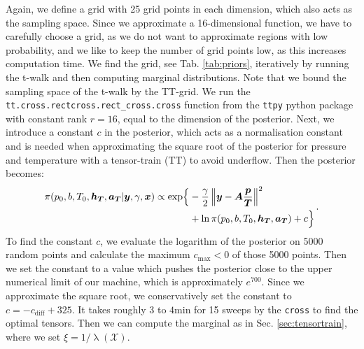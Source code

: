 Again, we define a grid with 25 grid points in each dimension, which also acts as the sampling space.
Since we approximate a 16-dimensional function, we have to carefully choose a grid, as we do not want to approximate regions with low probability, and we like to keep the number of grid points low, as this increases computation time.
We find the grid, see Tab. \ref{tab:priors}, iteratively by running the t-walk and then computing marginal distributions.
Note that we bound the sampling space of the t-walk by the TT-grid.
We run the  \texttt{tt.cross.rectcross.rect\_cross.cross} function from the \texttt{ttpy} python package \cite{} with constant rank $r = 16$, equal to the dimension of the posterior.
Next, we introduce a constant $c$ in the posterior, which acts as a normalisation constant and is needed when approximating the square root of the posterior for pressure and temperature with a tensor-train (TT) to avoid underflow.
Then the posterior becomes:
\begin{align}
	\begin{split}
		\pi(p_0,b,T_0,\bm{h_T},\bm{a_T} | \bm{y}, \gamma, \bm{x}) \propto  \exp\Bigl\{ & -\frac{\gamma}{2} \left\Vert \bm{y}- \bm{A} \frac{\bm{p}}{\bm{T}}  \right\Vert^2 \\ &+ \ln{\pi(p_0,b,T_0,\bm{h_T},\bm{a_T}) + c \Bigr\}  }
	\end{split} \, .
	\label{eq:TTpostPT}
\end{align}
To find the constant $c$, we evaluate the logarithm of the posterior on 5000 random points and calculate the maximum $c_{\text{max}} < 0$ of those 5000 points.
Then we set the constant to a value which pushes the posterior close to the upper numerical limit of our machine, which is approximately $e ^{700}$.
Since we approximate the square root, we conservatively set the constant to $c = -c_{\text{diff}} + 325$.
It takes roughly $3$ to $4$min for 15 sweeps by the \texttt{cross} to find the optimal tensors.
Then we can compute the marginal as in Sec. \ref{sec:tensortrain}, where we set $\xi = 1 / \uplambda (\mathcal{X})$.

